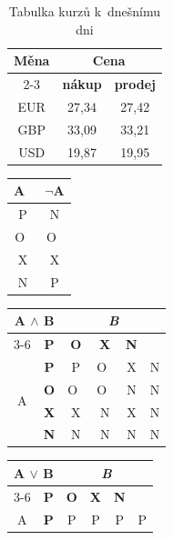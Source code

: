 \documentclass[a4paper, 11pt]{article}
\begin{document}
\bigskip
\begin{table}[ht]
  \center
  \begin{tabular}{ |c|c|c| }
    \hline
    \multirow{3}{1cm}{\textbf{Měna}} & \multicolumn{2}{|c|}{\textbf{Cena}} \\
    \cline{2-3}
    & \textbf{nákup} & \textbf{prodej} \\
    \hline
    EUR & 27,34 & 27,42 \\
    GBP & 33,09 & 33,21 \\
    USD & 19,87 & 19,95 \\
    \hline
  \end{tabular}
  \caption{Tabulka kurzů k~dnešnímu dni}
  \label{tabulka:1}
\end{table}

\bigskip
\begin{table}[ht]
  \center
  \begin{tabular}{ |c|c| }
    \hline
    A~& $\lnot$A \\
    \hline
    P & N \\
    \hline
    O~& O~\\
    \hline
    X & X \\
    \hline
    N & P \\
    \hline
  \end{tabular}
  \begin{tabular}{ |c|c|c|c|c|c| }
    \hline
    \multicolumn{2}{|c|}{\multirow{2}{*}{A $\land$ B}} &\multicolumn{4}{|c|}{\emph{B}} \\
    \cline{3-6}
    \multicolumn{2}{|c|}{} & \textbf{P} & \textbf{O} & \textbf{X} & \textbf{N} \\
    \hline
    \multirow{4}{*}{A} & \textbf{P} & P & O~& X & N \\
                       & \textbf{O} & O~& O~& N & N \\
                       & \textbf{X} & X & N & X & N \\
                       & \textbf{N} & N & N & N & N \\
    \hline
  \end{tabular}
  \begin{tabular}{ |c|c|c|c|c|c| }
    \hline
    \multicolumn{2}{|c|}{\multirow{2}{*}{A $\lor$ B}} &\multicolumn{4}{|c|}{\emph{B}} \\
    \cline{3-6}
    \multicolumn{2}{|c|}{} & \textbf{P} & \textbf{O} & \textbf{X} & \textbf{N} \\
    \hline
    \multirow{4}{*}{A} & \textbf{P} & P & P & P & P \\

\end{tabular}
\end{table}
\end{document}
